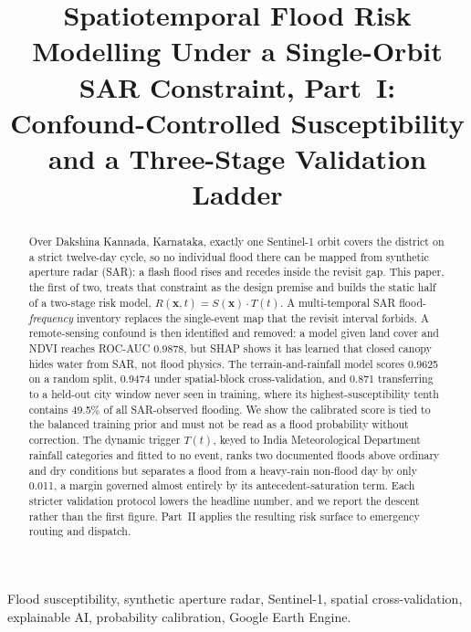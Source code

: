 \documentclass[journal]{IEEEtran}
\newcommand{\Sx}{S(\mathbf{x})}
\newcommand{\Tt}{T(t)}
\newcommand{\Rxt}{R(\mathbf{x},t)}
\begin{document}
\title{Spatiotemporal Flood Risk Modelling Under a Single-Orbit SAR Constraint, Part~I: Confound-Controlled Susceptibility and a Three-Stage Validation Ladder}

\author{}

\maketitle

\begin{abstract}
Over Dakshina Kannada, Karnataka, exactly one Sentinel-1 orbit
covers the district on a strict twelve-day cycle, so no individual flood there
can be mapped from synthetic aperture radar (SAR): a flash flood rises and
recedes inside the revisit gap. This paper, the first of two, treats that
constraint as the design premise and builds the static half of a two-stage risk
model, $\Rxt=\Sx\cdot\Tt$. A multi-temporal SAR flood-\emph{frequency} inventory
replaces the single-event map that the revisit interval forbids. A
remote-sensing confound is then identified and removed: a model given land cover
and NDVI reaches ROC-AUC 0.9878, but SHAP shows it has learned that closed
canopy hides water from SAR, not flood physics. The terrain-and-rainfall model
scores 0.9625 on a random split, 0.9474 under spatial-block cross-validation,
and 0.871 transferring to a held-out city window never seen in training, where
its highest-susceptibility tenth contains 49.5\% of all SAR-observed flooding.
We show the calibrated score is tied to the balanced training prior and must not
be read as a flood probability without correction. The dynamic trigger $\Tt$,
keyed to India Meteorological Department rainfall categories and fitted to no
event, ranks two documented floods above ordinary and dry conditions but
separates a flood from a heavy-rain non-flood day by only 0.011, a margin
governed almost entirely by its antecedent-saturation term. Each stricter
validation protocol lowers the headline number, and we report the descent rather
than the first figure. Part~II applies the resulting risk surface to emergency
routing and dispatch.
\end{abstract}

\begin{IEEEkeywords}
Flood susceptibility, synthetic aperture radar, Sentinel-1, spatial cross-validation, explainable AI, probability calibration, Google Earth Engine.
\end{IEEEkeywords}
\end{document}
